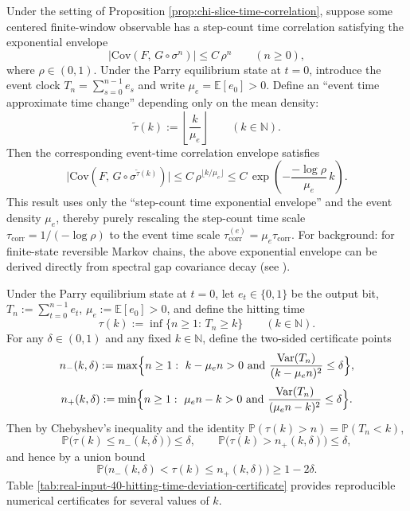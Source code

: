 

\begin{remark}\label{lem:chi-event-time-rescaling}
Under the setting of Proposition \ref{prop:chi-slice-time-correlation}, suppose some centered finite-window observable has a step-count time correlation satisfying the exponential envelope
$$
\bigl|\mathrm{Cov}(F,\,G\circ\sigma^n)\bigr|\le C\,\rho^n\qquad (n\ge 0),
$$
where $\rho\in(0,1)$.
Under the Parry equilibrium state at $t=0$, introduce the event clock $T_n=\sum_{s=0}^{n-1}e_s$ and write $\mu_e=\mathbb{E}[e_0]>0$.
Define an ``event time approximate time change'' depending only on the mean density:
$$
\widetilde\tau(k):=\left\lfloor\frac{k}{\mu_e}\right\rfloor\qquad (k\in\mathbb{N}).
$$
Then the corresponding event-time correlation envelope satisfies
$$
\bigl|\mathrm{Cov}(F,\,G\circ\sigma^{\widetilde\tau(k)})\bigr|
\le C\,\rho^{\lfloor k/\mu_e\rfloor}
\le C\,\exp\!\left(-\frac{-\log\rho}{\mu_e}\,k\right).
$$
This result uses only the ``step-count time exponential envelope'' and the event density $\mu_e$, thereby purely rescaling the step-count time scale $\tau_{\mathrm{corr}}=1/(-\log\rho)$ to the event time scale $\tau_{\mathrm{corr}}^{(e)}=\mu_e\tau_{\mathrm{corr}}$.
For background: for finite-state reversible Markov chains, the above exponential envelope can be derived directly from spectral gap covariance decay (see \cite[Chapter~12]{LevinPeresWilmer2009MarkovMixing}).
\end{remark}

\begin{remark}
\label{prop:chi-event-clock-hitting-time-certificate}
Under the Parry equilibrium state at $t=0$, let $e_t\in\{0,1\}$ be the output bit, $T_n:=\sum_{t=0}^{n-1}e_t$, $\mu_e:=\mathbb{E}[e_0]>0$, and define the hitting time
$$
\tau(k):=\inf\{n\ge 1:\,T_n\ge k\}\qquad (k\in\mathbb{N}).
$$
For any $\delta\in(0,1)$ and any fixed $k\in\mathbb{N}$, define the two-sided certificate points
$$
n_-(k,\delta):=\max\Bigl\{n\ge 1:\ k-\mu_e n>0\ \text{and}\ \frac{\mathrm{Var}(T_n)}{(k-\mu_e n)^2}\le\delta\Bigr\},
$$
$$
n_+(k,\delta):=\min\Bigl\{n\ge 1:\ \mu_e n-k>0\ \text{and}\ \frac{\mathrm{Var}(T_n)}{(\mu_e n-k)^2}\le\delta\Bigr\}.
$$
Then by Chebyshev's inequality and the identity $\mathbb{P}(\tau(k)>n)=\mathbb{P}(T_n<k)$,
$$
\mathbb{P}\bigl(\tau(k)\le n_-(k,\delta)\bigr)\le\delta,
\qquad
\mathbb{P}\bigl(\tau(k)>n_+(k,\delta)\bigr)\le\delta,
$$
and hence by a union bound
$$
\mathbb{P}\bigl(n_-(k,\delta)<\tau(k)\le n_+(k,\delta)\bigr)\ge 1-2\delta.
$$
Table \ref{tab:real-input-40-hitting-time-deviation-certificate} provides reproducible numerical certificates for several values of $k$.
\end{remark}

